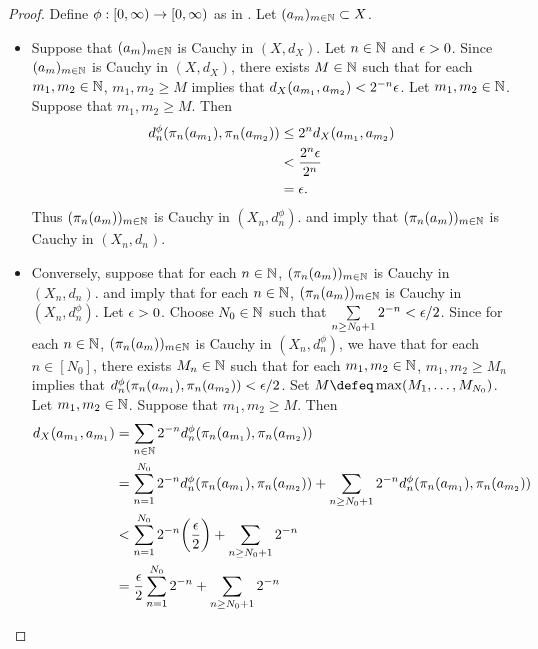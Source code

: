 \documentclass{book}
\begin{document}
\begin{proof}
	Define $\phi: [0,\infty) \rightarrow [0,\infty)$ as in . Let $(a_m)_{m \in \mathbb{N}} \subset X$. 
	\begin{itemize}
		\item Suppose that $(a_m)_{m \in \mathbb{N}}$ is Cauchy in $(X, d_X)$. Let $n \in \mathbb{N}$ and $\epsilon >0$. Since $(a_m)_{m \in \mathbb{N}}$ is Cauchy in $(X, d_X)$, there exists $M \in \mathbb{N}$ such that for each $m_1, m_2 \in \mathbb{N}$, $m_1, m_2 \geq M$ implies that $d_X(a_{m_1}, a_{m_2}) < 2^{-n} \epsilon$. Let $m_1, m_2 \in \mathbb{N}$. Suppose that $m_1, m_2 \geq M$. Then 
		\begin{align*}
			d^{\phi}_n(\pi_n(a_{m_1}), \pi_n(a_{m_2}))
			& \leq 2^{n} d_X(a_{m_1}, a_{m_2}) \\
			& < \frac{ 2^n \epsilon}{2^n} \\
			& = \epsilon.
		\end{align*}
		Thus $(\pi_n(a_m))_{m \in \mathbb{N}}$ is Cauchy in $(X_n, d_n^{\phi})$.  and  imply that $(\pi_n(a_m))_{m \in \mathbb{N}}$ is Cauchy in $(X_n, d_n)$.
		\item Conversely, suppose that for each $n \in \mathbb{N}$, $(\pi_n(a_m))_{m \in \mathbb{N}}$ is Cauchy in $(X_n, d_n)$.  and  imply that for each $n \in \mathbb{N}$, $(\pi_n(a_m))_{m \in \mathbb{N}}$ is Cauchy in $(X_n, d_n^{\phi})$. Let $\epsilon >0$. Choose $N_0 \in \mathbb{N}$ such that $\sum\limits_{n \geq N_0+1} 2^{-n} < \epsilon/2$. Since for each $n \in \mathbb{N}$, $(\pi_n(a_m))_{m \in \mathbb{N}}$ is Cauchy in $(X_n, d_n^{\phi})$, we have that for each $n \in [N_0]$, there exists $M_n \in \mathbb{N}$ such that for each $m_1, m_2 \in \mathbb{N}$, $m_1, m_2 \geq M_n$ implies that $d_n^{\phi}(\pi_n(a_{m_1}), \pi_n(a_{m_2})) < \epsilon / 2$. Set $M \defeq \max(M_1, \ldots, M_{N_0})$. Let $m_1, m_2 \in \mathbb{N}$. Suppose that $m_1, m_2 \geq M$. Then 
		\begin{align*}
			d_X(a_{m_1}, a_{m_1})
			& = \sum_{n \in \N} 2^{-n} d_n^{\phi}(\pi_n(a_{m_1}), \pi_n(a_{m_2})) \\
			& = \sum_{n =1}^{N_0} 2^{-n} d_n^{\phi}(\pi_n(a_{m_1}), \pi_n(a_{m_2})) + \sum_{n \geq N_0+1} 2^{-n} d_n^{\phi}(\pi_n(a_{m_1}), \pi_n(a_{m_2})) \\
			& < \sum_{n =1}^{N_0} 2^{-n} \bigg( \frac{\ep}{2} \bigg) + \sum_{n \geq N_0+1} 2^{-n} \\
			& = \frac{\ep}{2}\sum_{n =1}^{N_0} 2^{-n} + \sum_{n \geq N_0+1} 2^{-n} \\

\end{align*}
\end{itemize}
\end{proof}
\end{document}
